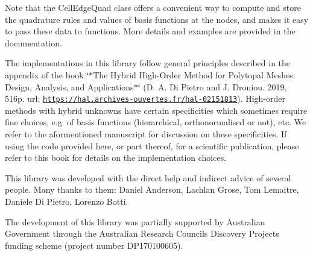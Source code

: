 Note that the {\ttfamily Cell\+Edge\+Quad} class offers a convenient way to compute and store the quadrature rules and values of basis functions at the nodes, and makes it easy to pass these data to functions. More details and examples are provided in the documentation.

The implementations in this library follow general principles described in the appendix of the book \char`\"{}$\ast$\+The Hybrid High-\/\+Order Method for Polytopal Meshes\+: Design, Analysis, and Applications$\ast$\char`\"{} (D. A. Di Pietro and J. Droniou. 2019, 516p. url\+: \href{https://hal.archives-ouvertes.fr/hal-02151813}{\tt https\+://hal.\+archives-\/ouvertes.\+fr/hal-\/02151813}). High-\/order methods with hybrid unknowns have certain specificities which sometimes require fine choices, e.\+g. of basis functions (hierarchical, orthonormalised or not), etc. We refer to the aformentioned manuscript for discussion on these specificities. If using the code provided here, or part thereof, for a scientific publication, please refer to this book for details on the implementation choices.

This library was developed with the direct help and indirect advice of several people. Many thanks to them\+: Daniel Anderson, Lachlan Grose, Tom Lemaitre, Daniele Di Pietro, Lorenzo Botti.

The development of this library was partially supported by Australian Government through the Australian Research Council\textquotesingle{}s Discovery Projects funding scheme (project number D\+P170100605). 